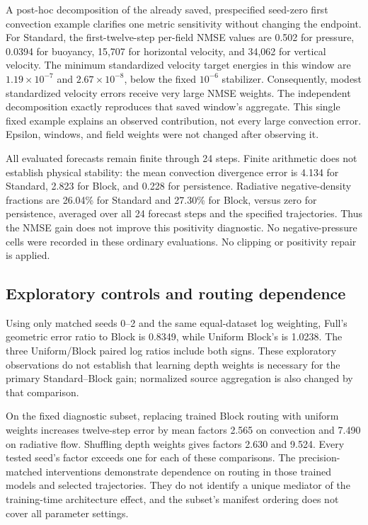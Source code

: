 A post-hoc decomposition of the already saved, prespecified seed-zero first convection example clarifies one metric sensitivity without changing the endpoint. For Standard, the first-twelve-step per-field NMSE values are 0.502 for pressure, 0.0394 for buoyancy, 15,707 for horizontal velocity, and 34,062 for vertical velocity. The minimum standardized velocity target energies in this window are $1.19\times10^{-7}$ and $2.67\times10^{-8}$, below the fixed $10^{-6}$ stabilizer. Consequently, modest standardized velocity errors receive very large NMSE weights. The independent decomposition exactly reproduces that saved window's aggregate\cite{studycode}. This single fixed example explains an observed contribution, not every large convection error. Epsilon, windows, and field weights were not changed after observing it.

All evaluated forecasts remain finite through 24 steps. Finite arithmetic does not establish physical stability: the mean convection divergence error is 4.134 for Standard, 2.823 for Block, and 0.228 for persistence. Radiative negative-density fractions are 26.04\% for Standard and 27.30\% for Block, versus zero for persistence, averaged over all 24 forecast steps and the specified trajectories. Thus the NMSE gain does not improve this positivity diagnostic. No negative-pressure cells were recorded in these ordinary evaluations. No clipping or positivity repair is applied.

\subsection{Exploratory controls and routing dependence}
Using only matched seeds 0--2 and the same equal-dataset log weighting, Full's geometric error ratio to Block is 0.8349, while Uniform Block's is 1.0238. The three Uniform/Block paired log ratios include both signs. These exploratory observations do not establish that learning depth weights is necessary for the primary Standard--Block gain; normalized source aggregation is also changed by that comparison.

On the fixed diagnostic subset, replacing trained Block routing with uniform weights increases twelve-step error by mean factors 2.565 on convection and 7.490 on radiative flow. Shuffling depth weights gives factors 2.630 and 9.524. Every tested seed's factor exceeds one for each of these comparisons. The precision-matched interventions demonstrate dependence on routing in those trained models and selected trajectories. They do not identify a unique mediator of the training-time architecture effect, and the subset's manifest ordering does not cover all parameter settings.

